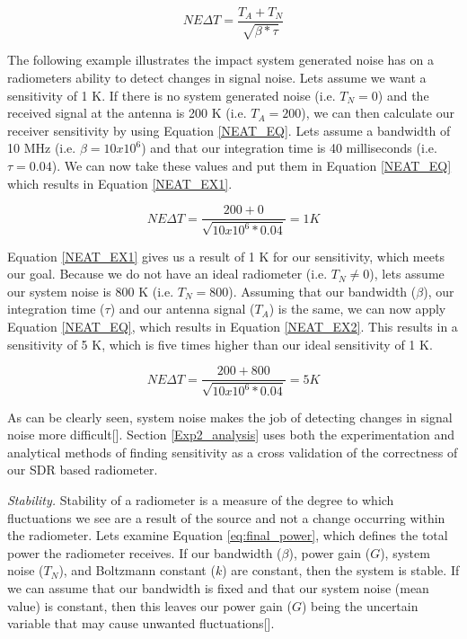 \begin{equation} \label{NEAT_EQ}
NE\Delta T=\frac{T_{A}+T_{N}}{\sqrt{\beta * \tau}} 
\end{equation}

The following example illustrates the impact system generated noise has on a radiometers ability to detect changes in signal noise.  Lets assume we want a sensitivity of 1 K.  If there is no system generated noise (i.e. $T_N = 0$) and the received signal at the antenna is 200 K (i.e. $T_A = 200$), we can then calculate our receiver sensitivity by using Equation \ref{NEAT_EQ}.  Lets assume a bandwidth of 10 MHz (i.e. $\beta = 10 x 10^6$) and that our integration time is 40 milliseconds (i.e. $\tau = 0.04$).  We can now take these values and put them in Equation \ref{NEAT_EQ} which results in Equation \ref{NEAT_EX1}.

\begin{equation} \label{NEAT_EX1}
NE\Delta T=\frac{200 + 0}{\sqrt{10 x 10^6 * 0.04}} = 1 K 
\end{equation}

Equation \ref{NEAT_EX1} gives us a result of 1 K for our sensitivity, which meets our goal.  Because we do not have an ideal radiometer (i.e. $T_N \neq 0$), lets assume our system noise is 800 K (i.e. $T_N = 800$).  Assuming that our bandwidth ($\beta$), our integration time ($\tau$) and our antenna signal ($T_A$) is the same, we can now apply Equation \ref{NEAT_EQ}, which results in Equation \ref{NEAT_EX2}.  This results in a sensitivity of 5 K, which is five times higher than our ideal sensitivity of 1 K. 

\begin{equation} \label{NEAT_EX2}
NE\Delta T=\frac{200 + 800}{\sqrt{10 x 10^6 * 0.04}} = 5 K 
\end{equation}

As can be clearly seen, system noise makes the job of detecting changes in signal noise more difficult[\cite{skou}].  Section \ref{Exp2_analysis} uses both the experimentation and analytical methods of finding sensitivity as a cross validation of the correctness of our SDR based radiometer.

\emph{Stability.}  Stability of a radiometer is a measure of the degree to which fluctuations we see are a result of the source and not a change occurring within the radiometer.  Lets examine Equation \ref{eq:final_power}, which defines the total power the radiometer receives.  If our bandwidth ($\beta$), power gain ($G$), system noise ($T_N$), and Boltzmann constant ($k$) are constant, then the system is stable.  If we can assume that our bandwidth is fixed and that our system noise (mean value) is constant, then this leaves our power gain ($G$) being the uncertain variable that may cause unwanted fluctuations[\cite{Evans}]. 


